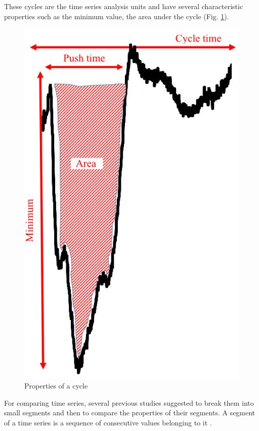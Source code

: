 These cycles are the time series analysis units and have several
characteristic properties such as the minimum value, the area under the cycle 
\cite{Vegter2014} (Fig. \ref{fig:cycleProp}). 

 \begin{figure}[h]
  \centering
   \includegraphics[scale=0.4]{images/sax-p/cycle_prop}
    \caption{Properties of a cycle}
  \label{fig:cycleProp}
  \end{figure}
	

For comparing time series, several previous studies suggested to break them into 
small segments and then to compare the properties of their segments.
A segment of a time series is a sequence of consecutive values belonging to it \cite{Abonyi2003}.


